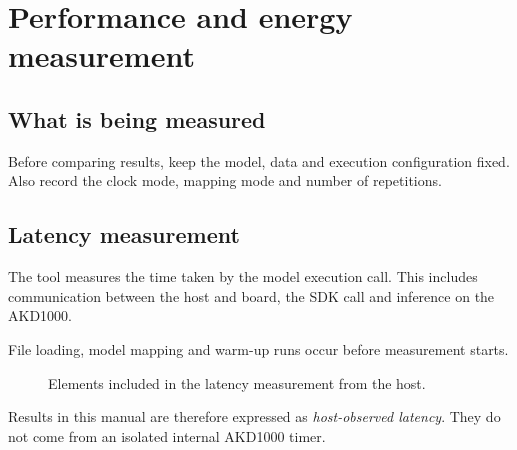 \chapter{Performance and energy measurement}
\label{chap:medida}
\label{chap:rendimiento}

\section{What is being measured}

Before comparing results, keep the model, data and execution configuration fixed.
Also record the clock mode, mapping mode and number of repetitions.

\section{Latency measurement}

The tool measures the time taken by the model execution call. This includes
communication between the host and board, the SDK call and inference on the AKD1000.

File loading, model mapping and warm-up runs occur before measurement starts.

\begin{figure}[H]
  \centering

  \caption[Latency measurement boundary]
  {Elements included in the latency measurement from the host.}
  \label{fig:measurement-boundary}
\end{figure}

Results in this manual are therefore expressed as \emph{host-observed latency}.
They do not come from an isolated internal AKD1000 timer.

